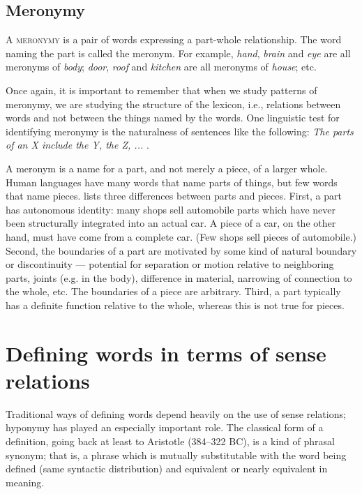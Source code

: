 \subsection{Meronymy}\label{sec:6.2.4}

A \textsc{meronymy} is a pair of words expressing a part-whole relationship. The word naming the part is called the meronym. For example, \textit{hand}, \textit{brain} and \textit{eye} are all meronyms of \textit{body}; \textit{door}, \textit{roof} and \textit{kitchen} are all meronyms of \textit{house}; etc.



Once again, it is important to remember that when we study patterns of meronymy, we are studying the structure of the lexicon, i.e., relations between words and not between the things named by the words. One linguistic test for identifying meronymy is the naturalness of sentences like the following: \textit{The parts of an X include the Y, the Z, ...} \citep[161]{Cruse1986}.



A meronym is a name for a part, and not merely a piece, of a larger whole. Human languages have many words that name parts of things, but few words that name pieces. \citet[158--159]{Cruse1986} lists three differences between parts and pieces. First, a part has autonomous identity: many shops sell automobile parts which have never been structurally integrated into an actual car. A piece of a car, on the other hand, must have come from a complete car. (Few shops sell pieces of automobile.) Second, the boundaries of a part are motivated by some kind of natural boundary or discontinuity — potential for separation or motion relative to neighboring parts, joints (e.g. in the body), difference in material, narrowing of connection to the whole, etc. The boundaries of a piece are arbitrary. Third, a part typically has a definite function relative to the whole, whereas this is not true for pieces.


\section{Defining words in terms of sense relations}\label{sec:6.3}

Traditional ways of defining words depend heavily on the use of sense relations; hyponymy has played an especially important role. The classical form of a definition, going back at least to Aristotle (384–322 BC), is a kind of phrasal synonym; that is, a phrase which is mutually substitutable with the word being defined (same syntactic distribution) and equivalent or nearly equivalent in meaning.



